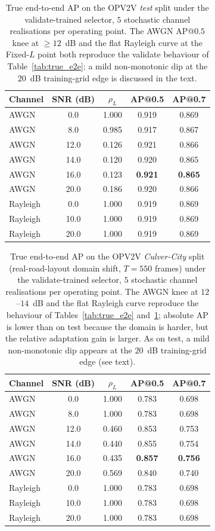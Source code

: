 \documentclass[journal]{IEEEtran}
\begin{document}
\begin{table}[t]
\centering
\caption{True end-to-end AP on the OPV2V \emph{test} split under the validate-trained selector, $5$ stochastic channel realisations per operating point. The AWGN AP@$0.5$ knee at $\ge 12$~dB and the flat Rayleigh curve at the Fixed-$L$ point both reproduce the validate behaviour of Table~\ref{tab:true_e2e}; a mild non-monotonic dip at the $20$~dB training-grid edge is discussed in the text.}\label{tab:gen_true_e2e}
\begin{tabular}{lcccc}
\toprule
Channel & SNR (dB) & $\rho_L$ & AP@0.5 & AP@0.7 \\
\midrule
AWGN     & 0.0  & 1.000 & 0.919 & 0.869 \\
AWGN     & 8.0  & 0.985 & 0.917 & 0.867 \\
AWGN     & 12.0 & 0.126 & 0.921 & 0.866 \\
AWGN     & 14.0 & 0.120 & 0.920 & 0.865 \\
AWGN     & 16.0 & 0.123 & \textbf{0.921} & \textbf{0.865} \\
AWGN     & 20.0 & 0.186 & 0.920 & 0.866 \\
Rayleigh & 0.0  & 1.000 & 0.919 & 0.869 \\
Rayleigh & 10.0 & 1.000 & 0.919 & 0.869 \\
Rayleigh & 20.0 & 1.000 & 0.919 & 0.869 \\
\bottomrule
\end{tabular}
\end{table}

\begin{table}[t]
\centering
\caption{True end-to-end AP on the OPV2V \emph{Culver-City} split (real-road-layout domain shift, $T=550$ frames) under the validate-trained selector, $5$ stochastic channel realisations per operating point. The AWGN knee at $12$--$14$~dB and the flat Rayleigh curve reproduce the behaviour of Tables~\ref{tab:true_e2e} and~\ref{tab:gen_true_e2e}; absolute AP is lower than on test because the domain is harder, but the relative adaptation gain is larger. As on test, a mild non-monotonic dip appears at the $20$~dB training-grid edge (see text).}\label{tab:gen_true_e2e_culver}
\begin{tabular}{lcccc}
\toprule
Channel & SNR (dB) & $\rho_L$ & AP@0.5 & AP@0.7 \\
\midrule
AWGN     & 0.0  & 1.000 & 0.783 & 0.698 \\
AWGN     & 8.0  & 1.000 & 0.783 & 0.698 \\
AWGN     & 12.0 & 0.460 & 0.853 & 0.753 \\
AWGN     & 14.0 & 0.440 & 0.855 & 0.754 \\
AWGN     & 16.0 & 0.435 & \textbf{0.857} & \textbf{0.756} \\
AWGN     & 20.0 & 0.569 & 0.840 & 0.740 \\
Rayleigh & 0.0  & 1.000 & 0.783 & 0.698 \\
Rayleigh & 10.0 & 1.000 & 0.783 & 0.698 \\
Rayleigh & 20.0 & 1.000 & 0.783 & 0.698 \\
\bottomrule
\end{tabular}
\end{table}
\end{document}
